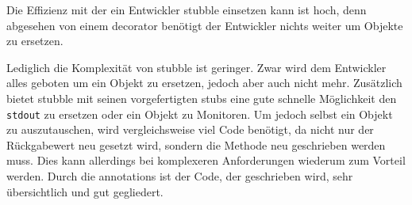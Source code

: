 Die Effizienz mit der ein Entwickler stubble einsetzen kann ist hoch, denn
abgesehen von einem \gls{decorator} benötigt der Entwickler nichts weiter um
Objekte zu ersetzen.

Lediglich die Komplexität von stubble ist geringer. Zwar wird dem Entwickler
alles geboten um ein Objekt zu ersetzen, jedoch aber auch nicht mehr.
Zusätzlich bietet stubble mit seinen vorgefertigten \Glspl{stub} eine gute
schnelle Möglichkeit den \lstinline{stdout} zu ersetzen oder ein Objekt zu
Monitoren. Um jedoch selbst ein Objekt zu auszutauschen, wird vergleichsweise
viel Code benötigt, da nicht nur der Rückgabewert neu gesetzt wird,
sondern die Methode neu geschrieben werden muss. Dies kann allerdings bei
komplexeren Anforderungen wiederum zum Vorteil werden. Durch die
\Glspl{annotation} ist der Code, der geschrieben wird, sehr übersichtlich und 
gut
gegliedert.